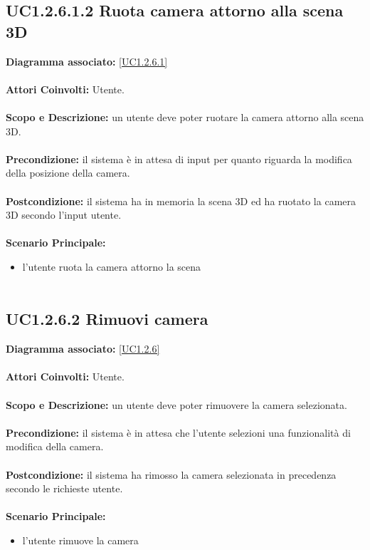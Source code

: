 \subsection{UC1.2.6.1.2 Ruota camera attorno alla scena 3D}
\textbf{Diagramma associato:}
\ref{UC1.2.6.1} \\ \\
\textbf{Attori Coinvolti:}
Utente. \\ \\
\textbf{Scopo e Descrizione:}
un utente deve poter ruotare la camera attorno alla scena 3D. \\ \\
\textbf{Precondizione:}
il sistema è in attesa di input per quanto riguarda la modifica della posizione della camera. \\ \\
\textbf{Postcondizione:}
il sistema ha in memoria la scena 3D ed ha ruotato la camera 3D secondo l'input utente. \\ \\
\textbf{Scenario Principale:}
\begin{itemize}
\item l'utente ruota la camera attorno la scena
\\ \\ \end{itemize}


\subsection{UC1.2.6.2 Rimuovi camera}
\textbf{Diagramma associato:}
\ref{UC1.2.6} \\ \\
\textbf{Attori Coinvolti:}
Utente. \\ \\
\textbf{Scopo e Descrizione:}
un utente deve poter rimuovere la camera selezionata. \\ \\
\textbf{Precondizione:}
il sistema è in attesa che l'utente selezioni una funzionalità di modifica della camera. \\ \\
\textbf{Postcondizione:}
il sistema ha rimosso la camera selezionata in precedenza secondo le richieste utente. \\ \\
\textbf{Scenario Principale:}
\begin{itemize}
\item l'utente rimuove la camera
\\ \\ \end{itemize}


